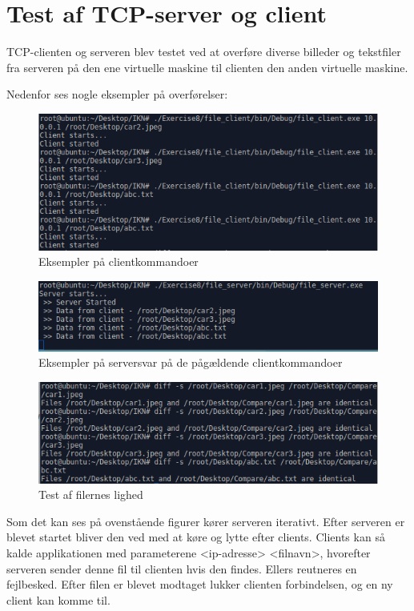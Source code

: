 \chapter{Test af TCP-server og client}\label{ch:test}
TCP-clienten og serveren blev testet ved at overføre diverse billeder og tekstfiler fra serveren på den ene virtuelle maskine til clienten den anden virtuelle maskine.

\noindent Nedenfor ses nogle eksempler på overførelser:

		\begin{figure}[H]
			\centering
			\includegraphics[width=160mm]{figures/Clientstart.png}
			\caption{Eksempler på clientkommandoer}
		\end{figure}

		\begin{figure}[H]
			\centering
			\includegraphics[width=160mm]{figures/Serverstart.png}
			\caption{Eksempler på serversvar på de pågældende clientkommandoer}
		\end{figure}
		
		\begin{figure}[H]
			\centering
			\includegraphics[width=160mm]{figures/compare.png}
			\caption{Test af filernes lighed}
		\end{figure}

\noindent Som det kan ses på ovenstående figurer kører serveren iterativt. Efter serveren er blevet startet bliver den ved med at køre og lytte efter clients. Clients kan så kalde applikationen med parameterene <ip-adresse> <filnavn>, hvorefter serveren sender denne fil til clienten hvis den findes. Ellers reutneres en fejlbesked. Efter filen er blevet modtaget lukker clienten forbindelsen, og en ny client kan komme til.